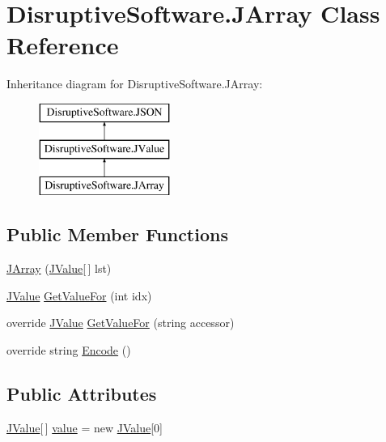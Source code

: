 \hypertarget{class_disruptive_software_1_1_j_array}{\section{Disruptive\+Software.\+J\+Array Class Reference}
\label{class_disruptive_software_1_1_j_array}
}
Inheritance diagram for Disruptive\+Software.\+J\+Array\+:\begin{figure}[H]
\begin{center}
\leavevmode
\includegraphics[height=3.000000cm]{class_disruptive_software_1_1_j_array}
\end{center}
\end{figure}
\subsection*{Public Member Functions}
\begin{DoxyCompactItemize}
\item 
\hyperlink{class_disruptive_software_1_1_j_array_a044e9bae4d591469c21a4459cbf2373b}{J\+Array} (\hyperlink{class_disruptive_software_1_1_j_value}{J\+Value}\mbox{[}$\,$\mbox{]} lst)
\item 
\hyperlink{class_disruptive_software_1_1_j_value}{J\+Value} \hyperlink{class_disruptive_software_1_1_j_array_a2ca3d4e22e51a2d1310b0f867714c1e0}{Get\+Value\+For} (int idx)
\item 
override \hyperlink{class_disruptive_software_1_1_j_value}{J\+Value} \hyperlink{class_disruptive_software_1_1_j_array_a55effcee1842af349e6cece22c26ac44}{Get\+Value\+For} (string accessor)
\item 
override string \hyperlink{class_disruptive_software_1_1_j_array_ac11259ae242de6f21b5eaf7d595215ca}{Encode} ()
\end{DoxyCompactItemize}
\subsection*{Public Attributes}
\begin{DoxyCompactItemize}
\item 
\hyperlink{class_disruptive_software_1_1_j_value}{J\+Value}\mbox{[}$\,$\mbox{]} \hyperlink{class_disruptive_software_1_1_j_array_a48b8805731cda932460723d7ae020284}{value} = new \hyperlink{class_disruptive_software_1_1_j_value}{J\+Value}\mbox{[}0\mbox{]}
\end{DoxyCompactItemize}
